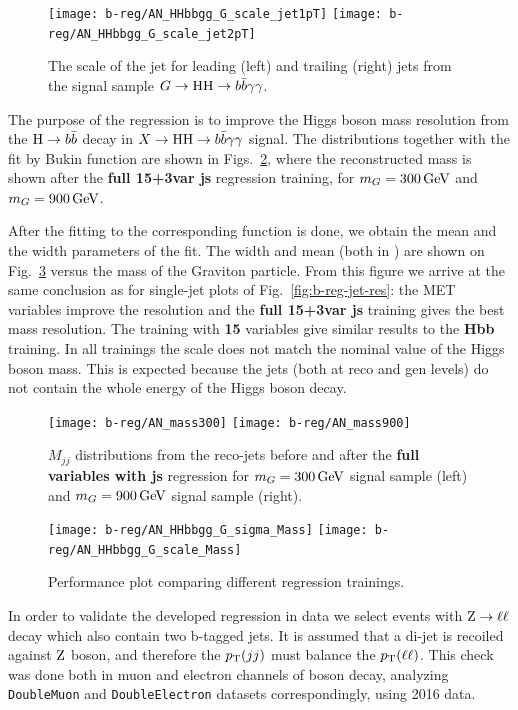   \begin{figure}[h]
  \centering
  \texttt{[image: b-reg/AN\_HHbbgg\_G\_scale\_jet1pT]}\hfil
  \texttt{[image: b-reg/AN\_HHbbgg\_G\_scale\_jet2pT]}\hfil\\
  \caption{The scale of the jet \PT for leading (left) and trailing (right) jets from the signal
    sample $G\to\mathrm{H}\mathrm{H}\to b\bar{b}\gamma\gamma$.}
  \label{fig:b-reg-jet-scale}
\end{figure}

The purpose of the regression is to improve the Higgs boson mass resolution from the $\mathrm{H}\to b\bar{b}$ decay in $X\to\mathrm{H}\mathrm{H}\to b\bar{b}\gamma\gamma$ signal.  
The distributions together with the fit by Bukin function are shown in Figs.~\ref{fig:b-reg-mH-fit-reco}, where the reconstructed mass is shown after the \textbf{full 15+3var js} regression training, for $m_G = 300\,\text{Ge\hspace{-.08em}V}$ and $m_G = 900\,\text{Ge\hspace{-.08em}V}$.

After the fitting to the corresponding function is done, we obtain the mean and the width parameters of the fit.  
The width and mean (both in \GeV) are shown on Fig.~\ref{fig:b-reg-mH-res} versus the mass of the Graviton particle.  
From this figure we arrive at the same conclusion  as for single-jet plots of Fig.~\ref{fig:b-reg-jet-res}: the MET variables improve the resolution and the \textbf{full 15+3var js} training gives the best mass resolution. 
The training with \textbf{15} variables give similar results to the \textbf{Hbb} training.  
In all trainings the scale does not match the nominal value of the Higgs boson mass. 
This is expected because the jets (both at reco and gen levels) do not contain the whole energy of the Higgs boson decay.

\begin{figure}[h]
  \centering
  \texttt{[image: b-reg/AN\_mass300]}\hfil
  \texttt{[image: b-reg/AN\_mass900]}\hfil
  \caption{$M_{jj}$ distributions from the reco-jets before and after
    the \textbf{full variables with js} regression for $m_G=300\,\text{Ge\hspace{-.08em}V}$ signal sample
    (left) and $m_G=900\,\text{Ge\hspace{-.08em}V}$ signal sample (right).}
  \label{fig:b-reg-mH-fit-reco}
\end{figure}

\begin{figure}[h]
  \centering
  \texttt{[image: b-reg/AN\_HHbbgg\_G\_sigma\_Mass]}\hfil
  \texttt{[image: b-reg/AN\_HHbbgg\_G\_scale\_Mass]}\hfil
  \caption{Performance plot comparing different regression trainings.}
  \label{fig:b-reg-mH-res}
\end{figure}


In order to validate the developed regression in data we select events with $\mathrm{Z}\to\ell\ell$ decay which also contain two b-tagged jets. 
It is assumed that a di-jet is recoiled against $\mathrm{Z}$ boson, and therefore the $p_{\mathrm{T}}(jj)$ must balance the $p_{\mathrm{T}}(\ell\ell)$.  
This check was done both in muon and electron channels of \Z boson decay, analyzing \verb|DoubleMuon| and \verb|DoubleElectron| datasets correspondingly, using 2016 data.

